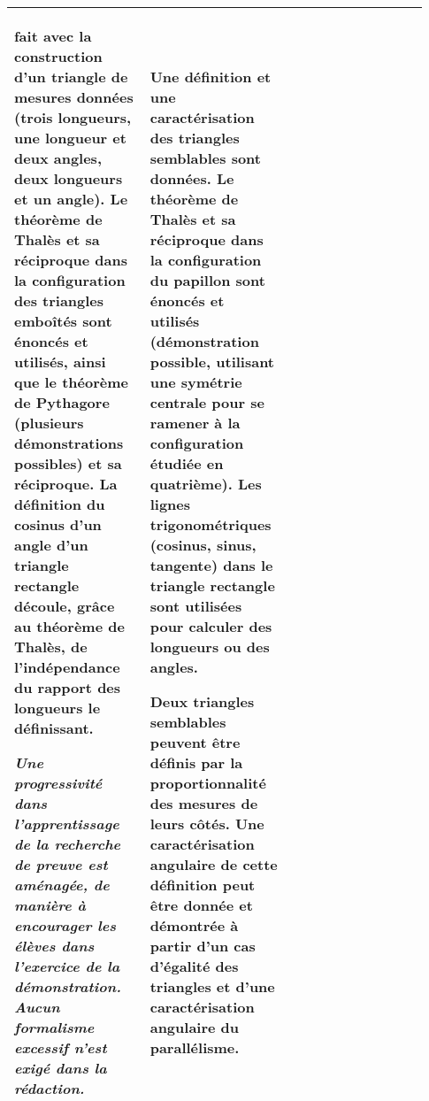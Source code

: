 {\begin{tabular}{|p{0.31\linewidth}|p{0.31\linewidth}|p{0.31\linewidth}|}
fait avec la construction d’un triangle de mesures
données (trois longueurs, une longueur et deux
angles, deux longueurs et un angle). Le théorème
de Thalès et sa réciproque dans la configuration
des triangles emboîtés sont énoncés et utilisés,
ainsi que le théorème de Pythagore (plusieurs
démonstrations possibles) et sa réciproque. La
définition du cosinus d’un angle d’un triangle
rectangle découle, grâce au théorème de Thalès,
de l’indépendance du rapport des longueurs le
définissant.\par 
\textit{Une progressivité dans l’apprentissage de la
recherche de preuve est aménagée, de manière à
encourager les élèves dans l’exercice de la
démonstration. Aucun formalisme excessif n’est
exigé dans la rédaction.
}
&
Une définition et une caractérisation des triangles
semblables sont données. Le théorème de Thalès
et sa réciproque dans la configuration du papillon
sont énoncés et utilisés (démonstration possible,
utilisant une symétrie centrale pour se ramener à la
configuration étudiée en quatrième). Les lignes
trigonométriques (cosinus, sinus, tangente) dans le
triangle rectangle sont utilisées pour calculer des
longueurs ou des angles.\par
Deux triangles semblables peuvent être définis par
la proportionnalité des mesures de leurs côtés. Une
caractérisation angulaire de cette définition peut
être donnée et démontrée à partir d’un cas d’égalité
des triangles et d’une caractérisation angulaire du
parallélisme.
\\\hline 
\end{tabular}
\renewcommand{\arraystretch}{1}
}